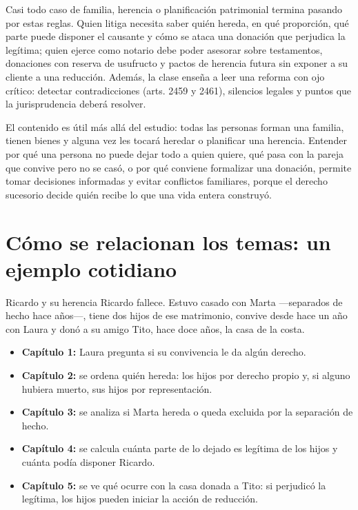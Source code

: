 \documentclass[12pt,oneside]{book}
\begin{document}
Casi todo caso de familia, herencia o planificación patrimonial termina pasando por estas reglas. Quien litiga necesita saber quién hereda, en qué proporción, qué parte puede disponer el causante y cómo se ataca una donación que perjudica la legítima; quien ejerce como notario debe poder asesorar sobre testamentos, donaciones con reserva de usufructo y pactos de herencia futura sin exponer a su cliente a una reducción. Además, la clase enseña a leer una reforma con ojo crítico: detectar contradicciones (arts. 2459 y 2461), silencios legales y puntos que la jurisprudencia deberá resolver.

El contenido es útil más allá del estudio: todas las personas forman una familia, tienen bienes y alguna vez les tocará heredar o planificar una herencia. Entender por qué una persona no puede dejar todo a quien quiere, qué pasa con la pareja que convive pero no se casó, o por qué conviene formalizar una donación, permite tomar decisiones informadas y evitar conflictos familiares, porque el derecho sucesorio decide quién recibe lo que una vida entera construyó.

\section*{Cómo se relacionan los temas: un ejemplo cotidiano}

\begin{example}{Ricardo y su herencia}
Ricardo fallece. Estuvo casado con Marta ---separados de hecho hace años---, tiene dos hijos de ese matrimonio, convive desde hace un año con Laura y donó a su amigo Tito, hace doce años, la casa de la costa.

\begin{itemize}
    \item \textbf{Capítulo 1:} Laura pregunta si su convivencia le da algún derecho.
    \item \textbf{Capítulo 2:} se ordena quién hereda: los hijos por derecho propio y, si alguno hubiera muerto, sus hijos por representación.
    \item \textbf{Capítulo 3:} se analiza si Marta hereda o queda excluida por la separación de hecho.
    \item \textbf{Capítulo 4:} se calcula cuánta parte de lo dejado es legítima de los hijos y cuánta podía disponer Ricardo.
    \item \textbf{Capítulo 5:} se ve qué ocurre con la casa donada a Tito: si perjudicó la legítima, los hijos pueden iniciar la acción de reducción.
\end{itemize}
\end{example}
\end{document}
